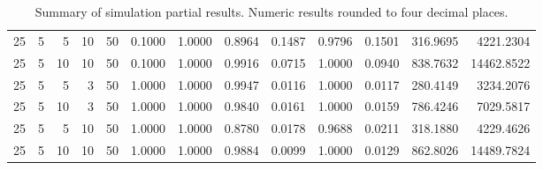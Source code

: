 \documentclass[AMA,Times1COL]{WileyNJDv5} %
\begin{document}
\begin{table}
\begin{tabular}{rrrrrrrrrrrrr}
25 &       5 &          5 & 10 & 50 &     0.1000 &      1.0000 &               0.8964 &     0.1487 &                0.9796 &      0.1501 &    316.9695 &    4221.2304 \\
25 &       5 &         10 & 10 & 50 &     0.1000 &      1.0000 &               0.9916 &     0.0715 &                1.0000 &      0.0940 &    838.7632 &   14462.8522 \\
25 &       5 &          5 &  3 & 50 &     1.0000 &      1.0000 &               0.9947 &     0.0116 &                1.0000 &      0.0117 &    280.4149 &    3234.2076 \\
25 &       5 &         10 &  3 & 50 &     1.0000 &      1.0000 &               0.9840 &     0.0161 &                1.0000 &      0.0159 &    786.4246 &    7029.5817 \\
25 &       5 &          5 & 10 & 50 &     1.0000 &      1.0000 &               0.8780 &     0.0178 &                0.9688 &      0.0211 &    318.1880 &    4229.4626 \\
25 &       5 &         10 & 10 & 50 &     1.0000 &      1.0000 &               0.9884 &     0.0099 &                1.0000 &      0.0129 &    862.8026 &   14489.7824 \\
\bottomrule
\end{tabular}

    \caption{Summary of simulation partial results.  Numeric results rounded to four decimal places.}
    \label{tab:simulation_results}
\end{table}
\end{document}
